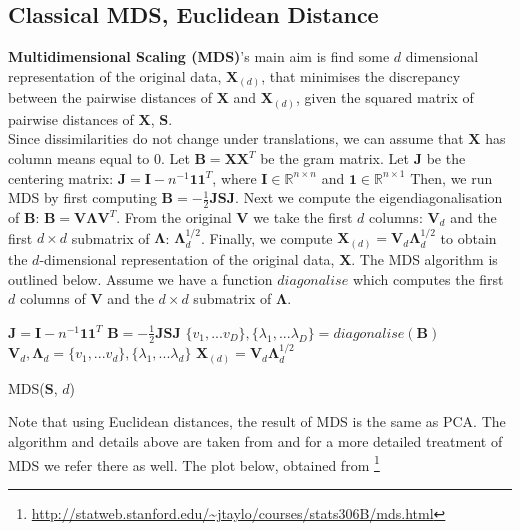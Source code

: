 \documentclass[12pt]{report}
\begin{document}
\subsection{Classical MDS, Euclidean Distance}
\textbf{Multidimensional Scaling (MDS)}'s 
main aim is find some $d$ dimensional representation of the
original data, $\mathbf{X}_{(d)}$,
that minimises the discrepancy between the pairwise distances 
of $\mathbf{X}$ and $\mathbf{X}_{(d)}$, 
given the squared matrix of pairwise distances of $\mathbf{X}$, $\mathbf{S}$.\\
Since dissimilarities do not change under translations, 
we can assume that $\mathbf{X}$ has column means equal to 0. 
Let $\mathbf{B} = \mathbf{X}\mathbf{X}^T$ be the gram matrix.
Let $\mathbf{J}$ be the centering matrix: 
$\mathbf{J} = \mathbf{I} - n^{-1}\mathbf{1}\mathbf{1}^T$, where 
$\mathbf{I} \in \mathbb{R}^{n \times n}$ and $\mathbf{1} \in \mathbb{R}^{n \times 1}$
Then, we run MDS by first computing  
$\mathbf{B} = -\frac{1}{2}\mathbf{J}\mathbf{S}\mathbf{J}$.
Next we compute the eigendiagonalisation of $\mathbf{B}$: 
$\mathbf{B} = \mathbf{V}\mathbf{\Lambda}\mathbf{V}^T$. 
From the original $\mathbf{V}$ we take the first $d$ columns: $\mathbf{V}_d$
and the first $d \times d$ submatrix of $\mathbf{\Lambda}$: $\mathbf{\Lambda}^{1/2}_d$.
Finally, we compute
$\mathbf{X}_{(d)} = \mathbf{V}_d\mathbf{\Lambda}^{1/2}_d$ to 
obtain the $d$-dimensional representation of the original data, $\mathbf{X}$. 
The MDS algorithm is outlined below. Assume we have a function $diagonalise$ which
computes the first $d$ columns of $\mathbf{V}$ and 
the $d \times d$ submatrix of $\mathbf{\Lambda}$.\\
\begin{algorithm}
    $\mathbf{J} = \mathbf{I} - n^{-1}\mathbf{1}\mathbf{1}^T$\;
    $\mathbf{B} = -\frac{1}{2}\mathbf{J}\mathbf{S}\mathbf{J}$\;
    $\{v_1,...v_D\}, \{\lambda_1,...\lambda_D\} = diagonalise(\mathbf{B})$\;
    $\mathbf{V}_d, \mathbf{\Lambda}_d = \{v_1,...v_d\}, \{\lambda_1,...\lambda_d\}$\;
    $\mathbf{X}_{(d)} = \mathbf{V}_d\mathbf{\Lambda}^{1/2}_d$\;
    \caption{MDS($\mathbf{S}$, $d$)}
\end{algorithm}
Note that using Euclidean distances, the result of MDS is the same as PCA. 
The algorithm and details above are taken from \cite{mds} and for a 
more detailed treatment of MDS we refer there as well. The plot below, obtained from
\footnote{\url{http://statweb.stanford.edu/~jtaylo/courses/stats306B/mds.html}} 
\end{document}
